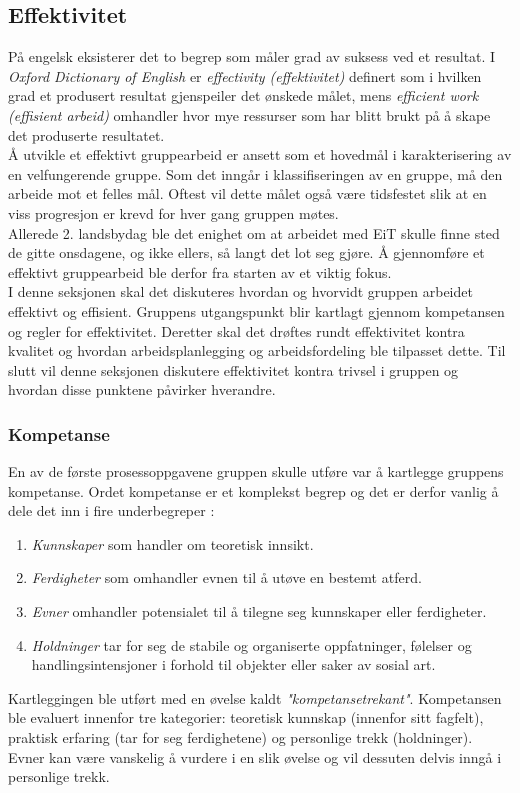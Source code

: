 \subsection{Effektivitet}
På engelsk eksisterer det to begrep som måler grad av suksess ved et resultat. 
I \textit{Oxford Dictionary of English} er \textit{effectivity (effektivitet)} definert som i hvilken grad et produsert resultat gjenspeiler det ønskede målet, mens \textit{efficient work (effisient arbeid)} omhandler hvor mye ressurser som har blitt brukt på å skape det produserte resultatet.\\

Å utvikle et effektivt gruppearbeid er ansett som et hovedmål i karakterisering av en velfungerende gruppe. 
Som det inngår i klassifiseringen av en gruppe, må den arbeide mot et felles mål. 
Oftest vil dette målet også være tidsfestet slik at en viss progresjon er krevd for hver gang gruppen møtes.\\

Allerede 2. landsbydag ble det enighet om at arbeidet med EiT skulle finne sted de gitte onsdagene, og ikke ellers, så langt det lot seg gjøre. 
Å gjennomføre et effektivt gruppearbeid ble derfor fra starten av et viktig fokus.\\

I denne seksjonen skal det diskuteres hvordan og hvorvidt gruppen arbeidet effektivt og effisient.
Gruppens utgangspunkt blir kartlagt gjennom kompetansen og regler for effektivitet.
Deretter skal det drøftes rundt effektivitet kontra kvalitet og hvordan arbeidsplanlegging og arbeidsfordeling ble tilpasset dette.
Til slutt vil denne seksjonen diskutere effektivitet kontra trivsel i gruppen og hvordan disse punktene påvirker hverandre.\\

\subsubsection{Kompetanse}
En av de første prosessoppgavene gruppen skulle utføre var å kartlegge gruppens kompetanse.
Ordet kompetanse er et komplekst begrep og det er derfor vanlig å dele det inn i fire underbegreper \cite{orgorg}:
\begin{enumerate}
\item \textit{Kunnskaper} som handler om teoretisk innsikt.
\item \textit{Ferdigheter} som omhandler evnen til å utøve en bestemt atferd.
\item \textit{Evner} omhandler potensialet til å tilegne seg kunnskaper eller ferdigheter.
\item \textit{Holdninger} tar for seg de stabile og organiserte oppfatninger, følelser og handlingsintensjoner i forhold til objekter eller saker av sosial art.
\end{enumerate}
Kartleggingen ble utført med en øvelse kaldt \emph{"kompetansetrekant"}.
Kompetansen ble evaluert innenfor tre kategorier: teoretisk kunnskap (innenfor sitt fagfelt), praktisk erfaring (tar for seg ferdighetene) og personlige trekk (holdninger).
Evner kan være vanskelig å vurdere i en slik øvelse og vil dessuten delvis inngå i personlige trekk.\\

